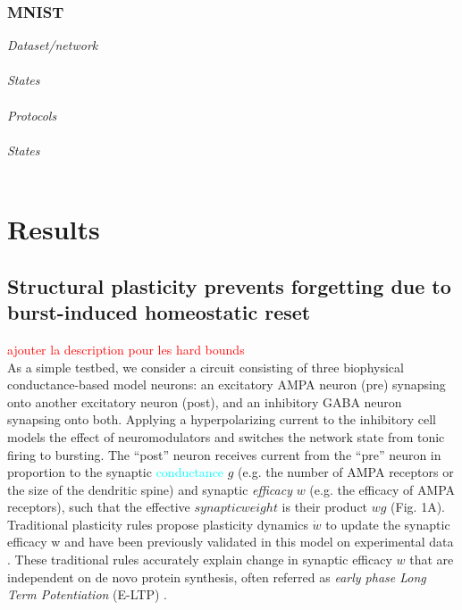 \subsubsection{MNIST}
\textit{Dataset/network}\\
~\\
\textit{States}\\
~\\
\textit{Protocols}\\
~\\
\textit{States}\\
~\\




%
%

\section{Results}
\subsection{Structural plasticity prevents forgetting due to burst-induced homeostatic reset}

\textcolor{red}{ajouter la description pour les hard bounds}\\
As a simple testbed, we consider a circuit consisting of three biophysical conductance-based model neurons: an excitatory AMPA neuron (pre) synapsing onto another excitatory neuron (post), and an inhibitory GABA neuron synapsing onto both. Applying a hyperpolarizing current to the inhibitory cell models the effect of neuromodulators and switches the network state from tonic firing to bursting. The “post” neuron receives current from the “pre” neuron in proportion to the synaptic \textcolor{cyan}{conductance} $g$ (e.g. the number of AMPA receptors or the size of the dendritic spine) and synaptic \textit{efficacy} $w$ (e.g. the efficacy of AMPA receptors), such that the effective $synaptic weight$ is their product $wg$ (Fig. 1A). Traditional plasticity rules \citep{song_competitive_2000, graupner_natural_2016, pfister_triplets_2006} propose plasticity dynamics $\dot{w}$ to update the synaptic efficacy w and have been previously validated in this model on experimental data \citep{sjostrom_rate_2001, bi_synaptic_1998}. These traditional rules accurately explain change in synaptic efficacy $w$ that are independent on de novo protein synthesis, often referred as \textit{early phase Long Term Potentiation }(E-LTP) \citep{lamprecht_structural_2004}. 

